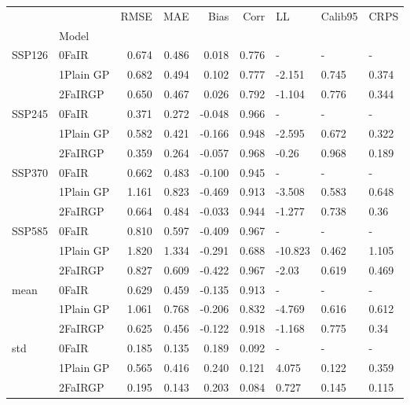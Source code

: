 \begin{tabular}{llrrrrlll}
\toprule
    &         &   RMSE &    MAE &   Bias &   Corr &      LL & Calib95 &   CRPS \\
{} & Model &        &        &        &        &         &         &        \\
\midrule
SSP126 & 0FaIR &  0.674 &  0.486 &  0.018 &  0.776 &       - &       - &      - \\
    & 1Plain GP &  0.682 &  0.494 &  0.102 &  0.777 &  -2.151 &   0.745 &  0.374 \\
    & 2FaIRGP &  0.650 &  0.467 &  0.026 &  0.792 &  -1.104 &   0.776 &  0.344 \\
SSP245 & 0FaIR &  0.371 &  0.272 & -0.048 &  0.966 &       - &       - &      - \\
    & 1Plain GP &  0.582 &  0.421 & -0.166 &  0.948 &  -2.595 &   0.672 &  0.322 \\
    & 2FaIRGP &  0.359 &  0.264 & -0.057 &  0.968 &   -0.26 &   0.968 &  0.189 \\
SSP370 & 0FaIR &  0.662 &  0.483 & -0.100 &  0.945 &       - &       - &      - \\
    & 1Plain GP &  1.161 &  0.823 & -0.469 &  0.913 &  -3.508 &   0.583 &  0.648 \\
    & 2FaIRGP &  0.664 &  0.484 & -0.033 &  0.944 &  -1.277 &   0.738 &   0.36 \\
SSP585 & 0FaIR &  0.810 &  0.597 & -0.409 &  0.967 &       - &       - &      - \\
    & 1Plain GP &  1.820 &  1.334 & -0.291 &  0.688 & -10.823 &   0.462 &  1.105 \\
    & 2FaIRGP &  0.827 &  0.609 & -0.422 &  0.967 &   -2.03 &   0.619 &  0.469 \\
mean & 0FaIR &  0.629 &  0.459 & -0.135 &  0.913 &       - &       - &      - \\
    & 1Plain GP &  1.061 &  0.768 & -0.206 &  0.832 &  -4.769 &   0.616 &  0.612 \\
    & 2FaIRGP &  0.625 &  0.456 & -0.122 &  0.918 &  -1.168 &   0.775 &   0.34 \\
std & 0FaIR &  0.185 &  0.135 &  0.189 &  0.092 &       - &       - &      - \\
    & 1Plain GP &  0.565 &  0.416 &  0.240 &  0.121 &   4.075 &   0.122 &  0.359 \\
    & 2FaIRGP &  0.195 &  0.143 &  0.203 &  0.084 &   0.727 &   0.145 &  0.115 \\
\bottomrule
\end{tabular}
